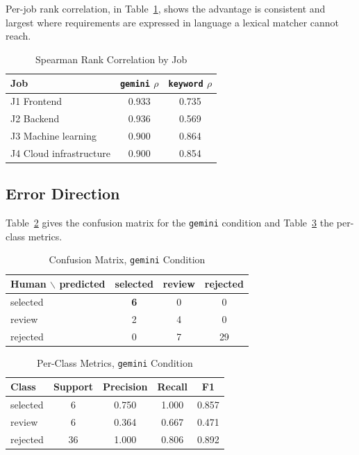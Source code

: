 \documentclass[conference]{IEEEtran}
\begin{document}
Per-job rank correlation, in Table~\ref{tab:perjob}, shows the advantage is
consistent and largest where requirements are expressed in language a lexical
matcher cannot reach.

\begin{table}[!t]
\caption{Spearman Rank Correlation by Job}
\label{tab:perjob}
\begin{center}
\begin{tabular}{|l|c|c|}
\hline
\textbf{Job} & \textbf{\texttt{gemini} $\rho$} & \textbf{\texttt{keyword} $\rho$} \\
\hline
J1 Frontend & 0.933 & 0.735 \\
\hline
J2 Backend & 0.936 & 0.569 \\
\hline
J3 Machine learning & 0.900 & 0.864 \\
\hline
J4 Cloud infrastructure & 0.900 & 0.854 \\
\hline
\end{tabular}
\end{center}
\end{table}

\subsection{Error Direction}

Table~\ref{tab:confusion} gives the confusion matrix for the \texttt{gemini}
condition and Table~\ref{tab:perclass} the per-class metrics.

\begin{table}[!t]
\caption{Confusion Matrix, \texttt{gemini} Condition}
\label{tab:confusion}
\begin{center}
\begin{tabular}{|l|c|c|c|}
\hline
\textbf{Human $\backslash$ predicted} & \textbf{selected} & \textbf{review} & \textbf{rejected} \\
\hline
selected & \textbf{6} & 0 & 0 \\
\hline
review & 2 & 4 & 0 \\
\hline
rejected & 0 & 7 & 29 \\
\hline
\end{tabular}
\end{center}
\end{table}

\begin{table}[!t]
\caption{Per-Class Metrics, \texttt{gemini} Condition}
\label{tab:perclass}
\begin{center}
\begin{tabular}{|l|c|c|c|c|}
\hline
\textbf{Class} & \textbf{Support} & \textbf{Precision} & \textbf{Recall} & \textbf{F1} \\
\hline
selected & 6 & 0.750 & 1.000 & 0.857 \\
\hline
review & 6 & 0.364 & 0.667 & 0.471 \\
\hline
rejected & 36 & 1.000 & 0.806 & 0.892 \\
\hline
\end{tabular}
\end{center}
\end{table}
\end{document}
